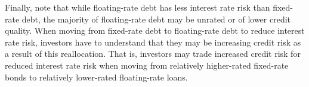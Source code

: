 \documentclass[11pt]{article}
\begin{document}
Finally, note that while floating-rate debt has less interest rate risk than fixed-rate debt, the majority of floating-rate debt may be unrated or of lower credit quality. When moving from fixed-rate debt to floating-rate debt to reduce interest rate risk, investors have to understand that they may be increasing credit risk as a result of this reallocation. That is, investors may trade increased credit risk for reduced interest rate risk when moving from relatively higher-rated fixed-rate bonds to relatively lower-rated floating-rate loans.
\end{document}
